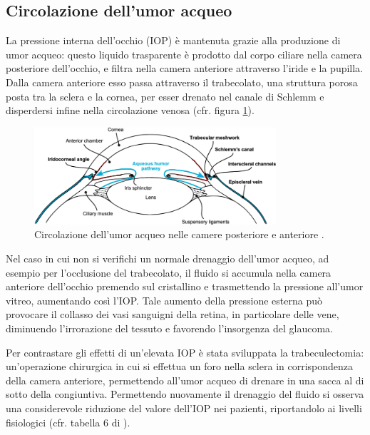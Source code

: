 \documentclass{article}
\begin{document}
\subsection{Circolazione dell'umor acqueo}
La pressione interna dell'occhio (IOP) è mantenuta grazie alla produzione di umor acqueo: questo liquido trasparente è prodotto dal corpo ciliare nella camera posteriore dell'occhio, e filtra nella camera anteriore attraverso l'iride e la pupilla.
Dalla camera anteriore esso passa attraverso il trabecolato, una struttura porosa posta tra la sclera e la cornea, per esser drenato nel canale di Schlemm e disperdersi infine nella circolazione venosa (cfr. figura \ref{umoracqueo}).
\begin{figure}[h]
\begin{center}
\includegraphics[width=0.8\textwidth]{Pictures/umor_acqueo.png}
\caption{Circolazione dell'umor acqueo nelle camere posteriore e anteriore \cite{Tesimmagine}.}
\label{umoracqueo}
\end{center}
\end{figure}
Nel caso in cui non si verifichi un normale drenaggio dell'umor acqueo, ad esempio per l'occlusione del trabecolato, il fluido si accumula nella camera anteriore dell'occhio premendo sul cristallino e trasmettendo la pressione all'umor vitreo, aumentando così l'IOP.
Tale aumento della pressione esterna può provocare il collasso dei vasi sanguigni della retina, in particolare delle vene, diminuendo l'irrorazione  del tessuto e favorendo l'insorgenza del glaucoma.

Per contrastare gli effetti di un'elevata IOP è stata sviluppata la trabeculectomia: un'operazione chirurgica in cui si effettua un foro nella sclera in corrispondenza della camera anteriore, permettendo all'umor acqueo di drenare in una sacca al di sotto  della congiuntiva.
Permettendo nuovamente il drenaggio del fluido si osserva una considerevole riduzione del valore dell'IOP nei pazienti, riportandolo ai livelli fisiologici (cfr. tabella 6 di \cite{art1}).
\end{document}
